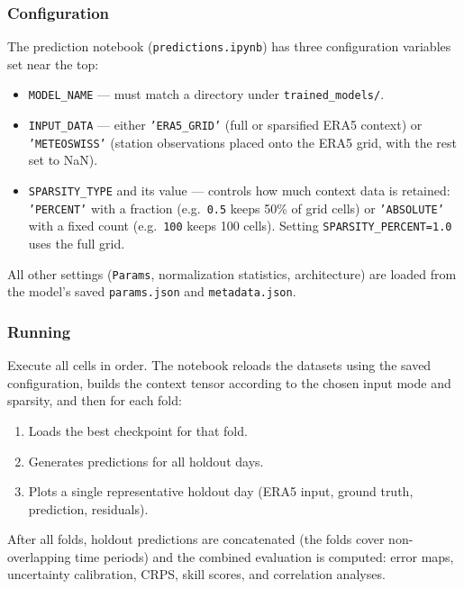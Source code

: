 \subsubsection{Configuration}

The prediction notebook (\texttt{predictions.ipynb}) has three configuration variables set near the top:

\begin{itemize}
  \item \texttt{MODEL\_NAME} --- must match a directory under \texttt{trained\_models/}.
  \item \texttt{INPUT\_DATA} --- either \texttt{'ERA5\_GRID'} (full or sparsified ERA5 context) or \texttt{'METEOSWISS'} (station observations placed onto the ERA5 grid, with the rest set to NaN).
  \item \texttt{SPARSITY\_TYPE} and its value --- controls how much context data is retained: \texttt{'PERCENT'} with a fraction (e.g.\ \texttt{0.5} keeps 50\% of grid cells) or \texttt{'ABSOLUTE'} with a fixed count (e.g.\ \texttt{100} keeps 100 cells). Setting \texttt{SPARSITY\_PERCENT=1.0} uses the full grid.
\end{itemize}

All other settings (\texttt{Params}, normalization statistics, architecture) are loaded from the model's saved \texttt{params.json} and \texttt{metadata.json}.

\subsubsection{Running}

Execute all cells in order.
The notebook reloads the datasets using the saved configuration, builds the context tensor according to the chosen input mode and sparsity, and then for each fold:

\begin{enumerate}
  \item Loads the best checkpoint for that fold.
  \item Generates predictions for all holdout days.
  \item Plots a single representative holdout day (ERA5 input, ground truth, prediction, residuals).
\end{enumerate}

After all folds, holdout predictions are concatenated (the folds cover non-overlapping time periods) and the combined evaluation is computed: error maps, uncertainty calibration, CRPS, skill scores, and correlation analyses.

